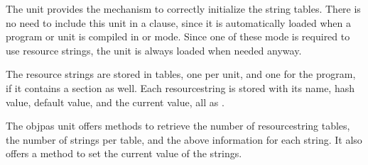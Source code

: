 The  unit provides the mechanism to correctly initialize
the string tables. There is no need to include this unit in a 
clause, since it is automatically loaded when a program or unit is
compiled in  or  mode. Since one of these mode 
is required to use resource strings, the unit is always loaded when needed
anyway.

The resource strings are stored in tables, one per unit, and one for the
program, if it contains a  section as well. Each
resourcestring is stored with its name, hash value, default value, and
the current value, all as .

The objpas unit offers methods to retrieve the number of resourcestring
tables, the number of strings per table, and the above information for each
string. It also offers a method to set the current value of the strings.

